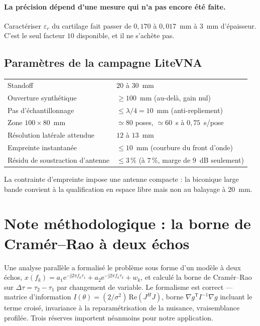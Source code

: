 \documentclass[11pt,a4paper]{article}
\newcommand{\eps}{\varepsilon_r}
\newcommand{\ee}{\mathrm{e}}
\newcommand{\jj}{\mathrm{j}}
\begin{document}
\paragraph{La précision dépend d'une mesure qui n'a pas encore été faite.}
Caractériser $\eps$ du cartilage fait passer de $0{,}170$ à $0{,}017$~mm à
$3$~mm d'épaisseur. C'est le seul facteur $10$ disponible, et il ne s'achète pas.

\subsection{Paramètres de la campagne LiteVNA}

\begin{table}[h]
\centering
\begin{tabular}{ll}
\toprule
Standoff & $20$ à $30$~mm \\
Ouverture synthétique & $\ge 100$~mm (au-delà, gain nul) \\
Pas d'échantillonnage & $\le \lambda/4 = 10$~mm (anti-repliement) \\
Zone $100 \times 80$~mm & $\simeq 80$ poses, $\simeq 60$~s à $0{,}75$~s/pose \\
Résolution latérale attendue & $12$ à $13$~mm \\
Empreinte instantanée & $\le 10$~mm (courbure du front d'onde) \\
Résidu de soustraction d'antenne & $\le 3\,\%$ (à $7\,\%$, marge de $9$~dB
                                   seulement) \\
\bottomrule
\end{tabular}
\end{table}

La contrainte d'empreinte impose une antenne compacte : la biconique large bande
convient à la qualification en espace libre mais non au balayage à $20$~mm.

\section{Note méthodologique : la borne de Cramér--Rao à deux échos}

Une analyse parallèle a formalisé le problème sous forme d'un modèle à deux
échos, $x(f_k) = a_1\ee^{-\jj 2\pi f_k \tau_1} + a_2\ee^{-\jj 2\pi f_k \tau_2}
+ w_k$, et calculé la borne de Cramér--Rao sur $\Delta\tau = \tau_2 - \tau_1$ par
changement de variable. Le formalisme est correct --- matrice d'information
$I(\theta) = (2/\sigma^2)\,\mathrm{Re}(J^H J)$, borne
$\nabla g^{\mathsf T} I^{-1} \nabla g$ incluant le terme croisé, invariance à la
reparamétrisation de la nuisance, vraisemblance profilée. Trois réserves
importent néanmoins pour notre application.
\end{document}
